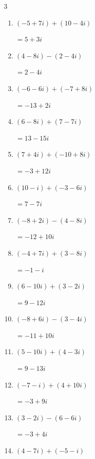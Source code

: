 \begin{multicols}{3}
\begin{enumerate}
  \item $\displaystyle (-5+7i) + (10-4i)$

        $\displaystyle =5+3i$

  \item $\displaystyle (4-8i) - (2-4i)$

        $\displaystyle =2-4i$

  \item $\displaystyle (-6-6i) + (-7+8i)$

        $\displaystyle =-13+2i$

  \item $\displaystyle (6-8i) + (7-7i)$

        $\displaystyle =13-15i$

  \item $\displaystyle (7+4i) + (-10+8i)$

        $\displaystyle =-3+12i$

  \item $\displaystyle (10-i) + (-3-6i)$

        $\displaystyle =7-7i$

  \item $\displaystyle (-8+2i) - (4-8i)$

        $\displaystyle =-12+10i$

  \item $\displaystyle (-4+7i) + (3-8i)$

        $\displaystyle =-1-i$

  \item $\displaystyle (6-10i) + (3-2i)$

        $\displaystyle =9-12i$

  \item $\displaystyle (-8+6i) - (3-4i)$

        $\displaystyle =-11+10i$

  \item $\displaystyle (5-10i) + (4-3i)$

        $\displaystyle =9-13i$

  \item $\displaystyle (-7-i) + (4+10i)$

        $\displaystyle =-3+9i$

  \item $\displaystyle (3-2i) - (6-6i)$

        $\displaystyle =-3+4i$

\columnbreak %

  \item $\displaystyle (4-7i) + (-5-i)$


\end{enumerate}
\end{multicols}
